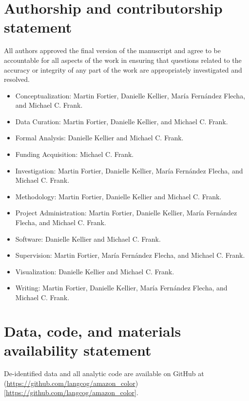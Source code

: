 \documentclass[
  ,apa7,floatsintext]{apa6}
\begin{document}
\hypertarget{authorship-and-contributorship-statement}{%
\section{Authorship and contributorship statement}\label{authorship-and-contributorship-statement}}

All authors approved the final version of the manuscript and agree to be accountable
for all aspects of the work in ensuring that questions related to the accuracy or integrity of any part of the work are appropriately investigated and resolved.

\begin{itemize}
\item
  Conceptualization: Martin Fortier, Danielle Kellier, María Fernández Flecha, and Michael C. Frank.
\item
  Data Curation: Martin Fortier, Danielle Kellier, and Michael C. Frank.
\item
  Formal Analysis: Danielle Kellier and Michael C. Frank.
\item
  Funding Acquisition: Michael C. Frank.
\item
  Investigation: Martin Fortier, Danielle Kellier, María Fernández Flecha, and Michael C. Frank.
\item
  Methodology: Martin Fortier, Danielle Kellier and Michael C. Frank.
\item
  Project Administration: Martin Fortier, Danielle Kellier, María Fernández Flecha, and Michael C. Frank.
\item
  Software: Danielle Kellier and Michael C. Frank.
\item
  Supervision: Martin Fortier, María Fernández Flecha, and Michael C. Frank.
\item
  Visualization: Danielle Kellier and Michael C. Frank.
\item
  Writing: Martin Fortier, Danielle Kellier, María Fernández Flecha, and Michael C. Frank.
\end{itemize}

\hypertarget{data-code-and-materials-availability-statement}{%
\section{Data, code, and materials availability statement}\label{data-code-and-materials-availability-statement}}

De-identified data and all analytic code are available on GitHub at (\url{https://github.com/langcog/amazon_color}){[}\url{https://github.com/langcog/amazon_color}{]}.
\end{document}
